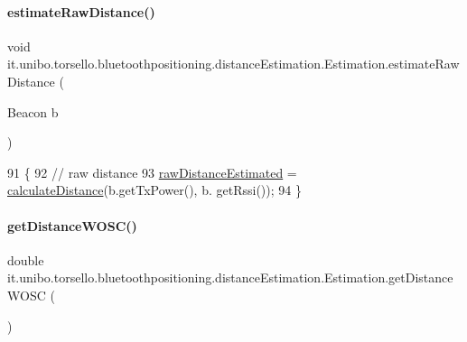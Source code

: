 \paragraph{\texorpdfstring{estimate\+Raw\+Distance()}{estimateRawDistance()}}
{\footnotesize\ttfamily void it.\+unibo.\+torsello.\+bluetoothpositioning.\+distance\+Estimation.\+Estimation.\+estimate\+Raw\+Distance (\begin{DoxyParamCaption}\item[{Beacon}]{b }\end{DoxyParamCaption})\hspace{0.3cm}{\ttfamily [private]}}


\begin{DoxyCode}
91                                                \{
92         \textcolor{comment}{// raw distance}
93         \hyperlink{classit_1_1unibo_1_1torsello_1_1bluetoothpositioning_1_1distanceEstimation_1_1Estimation_a5afcd0b9b73a92b64669f060206f35db_a5afcd0b9b73a92b64669f060206f35db}{rawDistanceEstimated} = \hyperlink{classit_1_1unibo_1_1torsello_1_1bluetoothpositioning_1_1distanceEstimation_1_1Estimation_a6e33d4e0b776517a86c6aa87cd51b66b_a6e33d4e0b776517a86c6aa87cd51b66b}{calculateDistance}(b.getTxPower(), b.
      getRssi());
94     \}
\end{DoxyCode}
\hypertarget{classit_1_1unibo_1_1torsello_1_1bluetoothpositioning_1_1distanceEstimation_1_1Estimation_a5c7bce21cd77c98a8d1e6df4c930397c_a5c7bce21cd77c98a8d1e6df4c930397c}{}\label{classit_1_1unibo_1_1torsello_1_1bluetoothpositioning_1_1distanceEstimation_1_1Estimation_a5c7bce21cd77c98a8d1e6df4c930397c_a5c7bce21cd77c98a8d1e6df4c930397c} 
\paragraph{\texorpdfstring{get\+Distance\+W\+O\+S\+C()}{getDistanceWOSC()}}
{\footnotesize\ttfamily double it.\+unibo.\+torsello.\+bluetoothpositioning.\+distance\+Estimation.\+Estimation.\+get\+Distance\+W\+O\+SC (\begin{DoxyParamCaption}{ }\end{DoxyParamCaption})}


